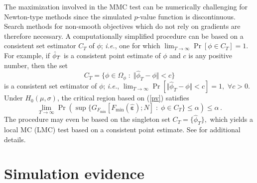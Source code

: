 \documentclass[11pt]{article}
\begin{document}
The maximization involved in the MMC test can be numerically challenging for
Newton-type methods since the simulated $p$-value function is discontinuous.
Search methods for non-smooth objectives which do not rely on gradients are
therefore necessary. A computationally simplified procedure can be based on
a consistent set estimator $C_{T}$ of $\phi $; \emph{i.e.}, one for which $%
\lim_{T\rightarrow \infty }\Pr [\phi \in C_{T}]=1$. For example, if $\hat{%
\phi}_{T}$ is a consistent point estimate of $\phi $ and $c$ is any positive
number, then the set 
\begin{equation*}
C_{T}=\big\{\phi \in \Omega _{\phi }\;:\;\Vert \hat{\phi}_{T}-\phi \Vert <c%
\big\}
\end{equation*}%
is a consistent set estimator of $\phi $; \emph{i.e.}, $\lim_{T\rightarrow
\infty }\Pr [\Vert \hat{\phi}_{T}-\phi \Vert <c]=1,$ $\forall c>0$. Under $%
H_{0}(\mu ,\sigma )$, the critical region based on (\ref{pv}) satisfies 
\begin{equation*}
\lim_{T\rightarrow \infty }\Pr \left( \sup \big\{G_{F_{\min }}[F_{\min }(%
\hat{\boldsymbol{\varepsilon }});N]\;:\;\phi \in C_{T}\big\}\leq \alpha
\right) \leq \alpha \,.
\end{equation*}%
The procedure may even be based on the singleton set $C_{T}=\{\hat{\phi}%
_{T}\},$ which yields a local MC (LMC) test based on a consistent point
estimate. See \citet{Dufour:2006} for additional details.

\section{Simulation evidence}
\end{document}
